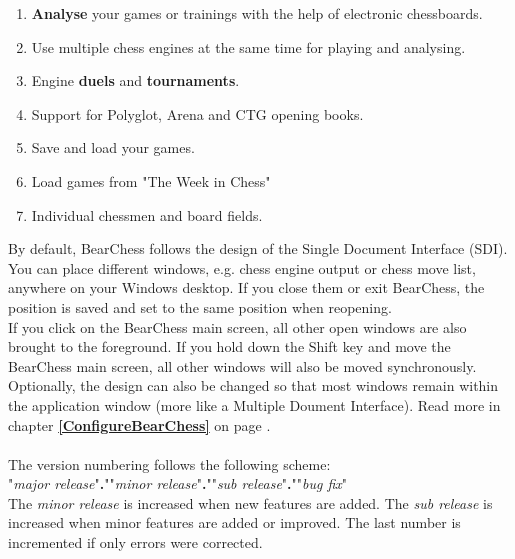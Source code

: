 \documentclass[11pt,a4paper]{article}
\begin{document}
\begin{enumerate}
		\item \textbf{Analyse} your games or trainings with the help of electronic chessboards.
		\item Use multiple chess engines at the same time for playing and analysing.
		\item Engine \textbf{duels} and \textbf{tournaments}.
		\item Support for Polyglot, Arena and CTG opening books.
		\item Save and load your games.
		\item Load games from "The Week in Chess"
		\item Individual chessmen and board fields.
	\end{enumerate}
	
	By default, BearChess follows the design of the Single Document Interface (SDI). You can place different windows, e.g. chess engine output or chess move list, anywhere on your Windows desktop. If you close them or exit BearChess, the position is saved and set to the same position when reopening.\\ 
	If you click on the BearChess main screen, all other open windows are also brought to the foreground. If you hold down the Shift key and move the BearChess main screen, all other windows will also be moved synchronously.\\
	Optionally, the design can also be changed so that most windows remain within the application window (more like a Multiple Doument Interface). Read more in chapter \textbf{\ref{ConfigureBearChess}  } on page \pageref{ConfigureBearChess}.\\\\
	The version numbering follows the following scheme:\\ 
	"\textit{major release}"\textbf{.}""\textit{minor release}"\textbf{.}""\textit{sub release}"\textbf{.}""\textit{bug fix}"\\
	The \textit{minor release} is increased when new features are added. The \textit{sub release} is increased when minor features are added or improved. The last number is incremented if only errors were corrected.
	
	
\end{document}
